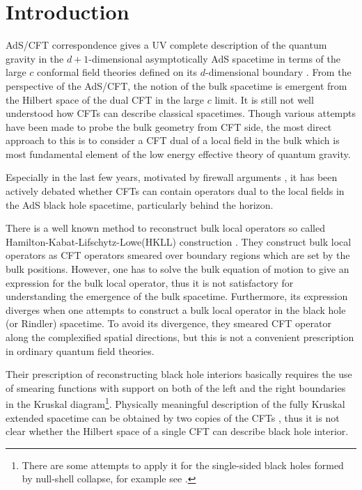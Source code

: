 \documentclass[11pt,a4paper]{article}
\begin{document}
\maketitle
\flushbottom


\newpage

\section{Introduction}
AdS/CFT correspondence gives a UV complete description of the quantum gravity in the $d+1$-dimensional asymptotically AdS spacetime in terms of the large $c$ conformal field theories defined on its $d$-dimensional boundary \cite{Mal}.
From the perspective of the AdS/CFT, the notion of the bulk spacetime is emergent from the Hilbert space of the dual CFT in the large $c$ limit. It is still not well understood how CFTs can describe classical spacetimes. 
Though various attempts have been made to probe the bulk geometry from CFT side, the most direct approach to this is to consider a CFT dual of a local field in the bulk which is most fundamental element of the low energy effective theory of quantum gravity.

Especially in the last few years, motivated by firewall arguments \cite{AMPS}\cite{AMPSS}\cite{MP0}, it has been actively debated whether CFTs can contain operators dual to the local fields in the AdS black hole spacetime, particularly behind the horizon.

There is a well known method to reconstruct bulk local operators so called Hamilton-Kabat-Lifschytz-Lowe(HKLL) construction \cite{HKLL0}\cite{HKLL1}\cite{HKLL2}\cite{HKLL3}. They construct bulk local operators as  CFT operators smeared over boundary regions which are set by the bulk positions. However, one has to solve the bulk equation of motion to give an expression for the bulk local operator, thus it is not satisfactory for understanding the emergence of the bulk spacetime. Furthermore, its expression diverges when one attempts to construct a bulk local operator in the black hole (or Rindler) spacetime. To avoid its divergence, they smeared CFT operator along the complexified spatial directions, but this is not a convenient prescription in ordinary quantum field theories.

Their prescription of reconstructing black hole interiors basically requires the use of smearing functions with support on both of the left and the right boundaries in the Kruskal diagram\footnote{There are some attempts to apply it for the single-sided black holes formed by null-shell collapse, for example see \cite{HKLL2}\cite{RS}.}. Physically meaningful description of the fully Kruskal extended spacetime can be obtained by two copies of the CFTs \cite{Ete}, thus it is not clear whether the Hilbert space of a single CFT can describe black hole interior. 
\end{document}
